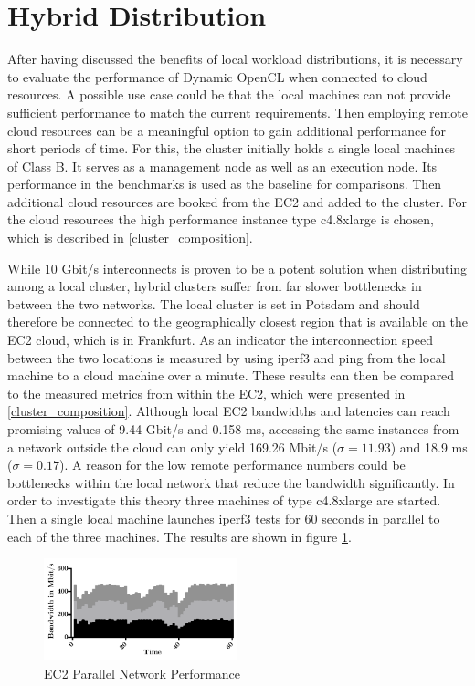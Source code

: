 \section{Hybrid Distribution}

After having discussed the benefits of local workload distributions, it is necessary to evaluate the performance of Dynamic OpenCL when connected to cloud resources. A possible use case could be that the local machines can not provide sufficient performance to match the current requirements. Then employing remote cloud resources can be a meaningful option to gain additional performance for short periods of time. For this, the cluster initially holds a single local machines of Class B. It serves as a management node as well as an execution node. Its performance in the benchmarks is used as the baseline for comparisons. Then additional cloud resources are booked from the EC2 and added to the cluster. For the cloud resources the high performance instance type c4.8xlarge is chosen, which is described in \ref{cluster_composition}.

While 10 Gbit/s interconnects is proven to be a potent solution when distributing among a local cluster, hybrid clusters suffer from far slower bottlenecks in between the two networks. The local cluster is set in Potsdam and should therefore be connected to the geographically closest region that is available on the EC2 cloud, which is in Frankfurt. As an indicator the interconnection speed between the two locations is measured by using iperf3 and ping from the local machine to a cloud machine over a minute. These results can then be compared to the measured metrics from within the EC2, which were presented in \ref{cluster_composition}. Although local EC2 bandwidths and latencies can reach promising values of 9.44 Gbit/s and 0.158 ms, accessing the same instances from a network outside the cloud can only yield 169.26 Mbit/s ($\sigma = 11.93$) and 18.9 ms ($\sigma = 0.17$). A reason for the low remote performance numbers could be bottlenecks within the local network that reduce the bandwidth significantly. In order to investigate this theory three machines of type c4.8xlarge are started. Then a single local machine launches iperf3 tests for 60 seconds in parallel to each of the three machines. The results are shown in figure \ref{img:EC2 Parallel Network Performance}.

\begin{figure}[!htb]
	\includegraphics[width=0.5\textwidth]{images/ec2_stacked_network_performance.pdf}
	\centering
	\caption{EC2 Parallel Network Performance}
	\label{img:EC2 Parallel Network Performance}
\end{figure}

